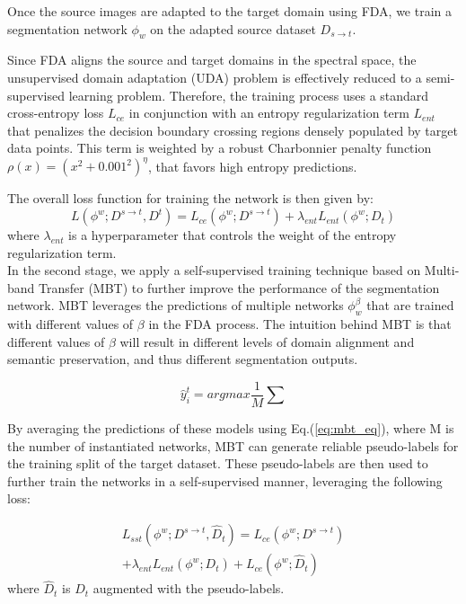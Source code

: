\documentclass[10pt,twocolumn,letterpaper]{article}
\begin{document}
Once the source images are adapted to the target domain using FDA, we train a segmentation network $\phi_w$ on the adapted source dataset $D_{s \rightarrow t}$. 

Since FDA aligns the source and target domains in the spectral space, the unsupervised domain adaptation (UDA) problem is effectively reduced to a semi-supervised learning problem. Therefore, the training process uses a standard cross-entropy loss $L_{ce}$ in conjunction with an entropy regularization term $L_{ent}$ that penalizes the decision boundary crossing regions densely populated by target data points. This term is weighted by a robust Charbonnier penalty function $\rho(x) = (x^2 + 0.001^2)^{\eta}$, that favors high entropy predictions.

The overall loss function for training the network is then given by:
\begin{equation}
  L(\phi^w; D^{s \rightarrow t}, D^t) = L_{ce}(\phi^w; D^{s \rightarrow t}) + \lambda_{ent} L_{ent}(\phi^w; D_t)
\label{eq:overall_loss}
\end{equation}
where $\lambda_{ent}$ is a hyperparameter that controls the weight of the entropy regularization term.\\

In the second stage, we apply a self-supervised training technique based on Multi-band Transfer (MBT) to further improve the performance of the segmentation network. MBT leverages the predictions of multiple networks $\phi_w^{\beta}$ that are trained with different values of $\beta$ in the FDA process. The intuition behind MBT is that different values of $\beta$ will result in different levels of domain alignment and semantic preservation, and thus different segmentation outputs.

\begin{equation}
    \hat{y}^t_i = arg max \frac{1}{M} \sum
\label{eq:mbt_eq}
\end{equation}

By averaging the predictions of these models using Eq.(\ref{eq:mbt_eq}), where M is the number of instantiated networks, MBT can generate reliable pseudo-labels for the training split of the target dataset. These pseudo-labels are then used to further train the networks in a self-supervised manner, leveraging the following loss:

\begin{equation}
\begin{split}
    L_{sst}(\phi^w; D^{s \rightarrow t}, \hat{D}_t) = L_{ce}(\phi^w; D^{s \rightarrow t})\\
    + \lambda_{ent} L_{ent}(\phi^w; D_t)+ L_{ce}(\phi^w; \hat{D}_t)
\end{split}
\label{eq:SS_training_loss}
\end{equation}
where $\hat{D}_t$ is ${D}_t$ augmented with the pseudo-labels.
\end{document}
